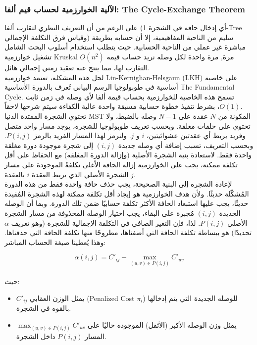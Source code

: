 \documentclass{article}
\newcommand{\en}[1]{\textenglish{#1}}
\begin{document}
\subsubsection{الآلية الخوارزمية لحساب قيم ألفا: \en{The Cycle-Exchange Theorem}}
على الرغم من أن التعريف النظري لتقارب ألفا (أي إدخال حافة في الشجرة \en{1-Tree} وقياس فرق التكلفة الإجمالي) سليم من الناحية المفاهيمية، إلا أن حسابه بطريقة مباشرة غير عملي من الناحية الحسابية. حيث يتطلب استخدام أسلوب البحث الشامل تشغيل خوارزمية \en{Kruskal} $O(n^2)$ مرة, مرة واحدة لكل وصله نريد حساب قيمه التقارب لها، مما ينتج عنه تعقيد زمني إجمالي هائل.\\

لحل هذه المشكلة، تعتمد خوارزمية \en{Lin-Kernighan-Helsgaun (LKH)} على خاصية أساسية في طوبولوجيا الرسم البياني تُعرف بالدورة الأساسية \en{The Fundamental Cycle}. تسمح هذه الخاصية للخوارزمية بحساب قيمة ألفا لأي وصله في زمن ثابت $O(1)$، بشرط تنفيذ خطوة حسابية مسبقة واحدة عالية الكفاءة سيتم شرحها لاحقاً.\\

تحتوي الشجرة الممتدة الدنيا \en{MST} المكونة من $N$ عقدة على $N-1$ وصله بالضبط، ولا تحتوي على حلقات مغلقة. وبحسب تعريف طوبولوجيا للشجرة، يوجد مسار واحد متصل وفريد ​​يربط أي عقدتين عشوائيتين، $i$ و $j$. ولنرمز لهذا المسار الفريد بالرمز $P(i,j)$. وبحسب التعريف، تسبب إضافة أي وصله جديدة $(i,j)$ إلى شجرة موجودة دورة مغلقة واحدة فقط. لاستعادة بنية الشجرة الأصلية (وإزالة الدورة المغلقه) مع الحفاظ على أقل تكلفة ممكنة، يجب على الخوارزمية إزالة الحافة الأغلى تكلفةً الموجودة على مسار الشجرة الأصلي الذي يربط العقدة $i$ بالعقدة $j$.\\

لإعادة الشجره إلى البنية الصحيحة، يجب حذف حافة واحدة فقط من هذه الدورة المُشكّلة حديثًا. ولأن هدف الخوارزمية هو إيجاد أقل تكلفة ممكنة لهذه الشجرة المُقيدة حديثًا، يجب عليها استبعاد الحافة الأكثر تكلفة حسابيًا ضمن تلك الدورة. وبما أن الوصله الجديدة $(i,j)$ مُجبرة على البقاء، يجب اختيار الوصله المحذوفة من مسار الشجرة الأصلي $P(i,j)$. لذا، فإن التغير الصافي في التكلفة الإجمالية للشجرة (وهو تعريف $\alpha$ تحديدًا) هو ببساطة تكلفة الحافة التي أضفناها، مطروحًا منها تكلفة الحافة التي حذفناها. وهذا يُعطينا صيغة الحساب المباشر:

{\LARGE$$
\alpha(i,j) = C'_{ij} - \max_{(u,v) \in P(i,j)} C'_{uv}
$$}\\

حيث:\\

	\begin{itemize}
		\item $C'_{ij}$
يمثل الوزن العقابي (\en{Penalized Cost $\pi_i$}) للوصله الجديدة التي يتم إدخالها بالقوه في الشجرة.

		\item $\max_{(u,v) \in P(i,j)} C'_{uv}$
يمثل وزن الوصله الأكبر (الأثقل) الموجودة حاليًا على المسار $P(i,j)$ داخل الشجرة.\\
	\end{itemize}
\end{document}
